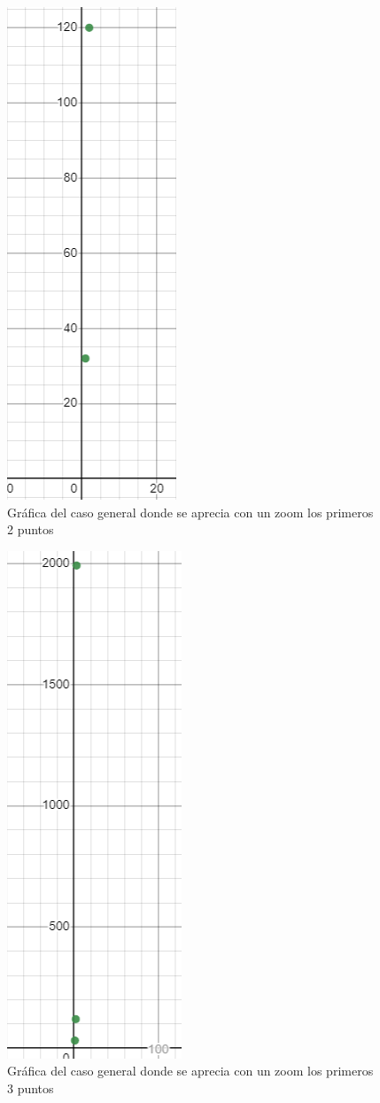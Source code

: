 \documentclass[12pt,twoside]{article}
\begin{document}
\begin{figure}[h!]
\centering
\includegraphics[scale=0.7]{Perf1.png}
\caption{Gráfica del caso general donde se aprecia con un zoom los primeros 2 puntos}
\label{fig:universe}
\end{figure}

\begin{figure}[h!]
\centering
\includegraphics[scale=0.7]{perf2.png}
\caption{Gráfica del caso general donde se aprecia con un zoom los primeros 3 puntos}
\label{fig:universe}
\end{figure}
\end{document}
